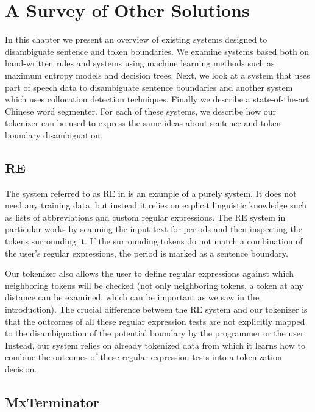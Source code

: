 \chapter{A Survey of Other Solutions}
\label{chap:survey}

In this chapter we present an overview of existing systems designed to
disambiguate sentence and token boundaries. We examine systems based both on
hand-written rules and systems using machine learning methods such as maximum
entropy models and decision trees. Next, we look at a system that uses part of
speech data to disambiguate sentence boundaries and another system which uses
collocation detection techniques. Finally we describe a state-of-the-art
Chinese word segmenter. For each of these systems, we describe how our
tokenizer can be used to express the same ideas about sentence and token
boundary disambiguation.

\section{RE}
\label{sec:survey-re}

The system \cite{sbd-re} referred to as RE in \cite{sbd-punkt} is an example of
a purely  system. It does not need any training data, but
instead it relies on explicit linguistic knowledge such as lists of
abbreviations and custom regular expressions. The RE system in particular works
by scanning the input text for periods and then inspecting the tokens
surrounding it. If the surrounding tokens do not match a combination of the
user's regular expressions, the period is marked as a sentence boundary.

Our tokenizer also allows the user to define regular expressions against which
neighboring tokens will be checked (not only neighboring tokens, a token at any
distance can be examined, which can be important as we saw in the
introduction). The crucial difference between the RE system and our tokenizer
is that the outcomes of all these regular expression tests are not explicitly
mapped to the disambiguation of the potential boundary by the programmer or the
user. Instead, our system relies on already tokenized data from which it learns
how to combine the outcomes of these regular expression tests into a
tokenization decision.

\section{MxTerminator}
\label{sec:survey-mxterm}


